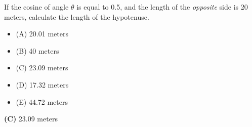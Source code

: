 

If the cosine of angle $\theta$ is equal to 0.5, and the length of the {\it opposite} side is 20 meters, calculate the length of the hypotenuse.

\begin{itemize}
\item{(A)} 20.01 meters
\vskip 5pt 
\item{(B)} 40 meters
\vskip 5pt 
\item{(C)} 23.09 meters
\vskip 5pt 
\item{(D)} 17.32 meters
\vskip 5pt 
\item{(E)} 44.72 meters
\end{itemize}







{\bf (C)} 23.09 meters
 










